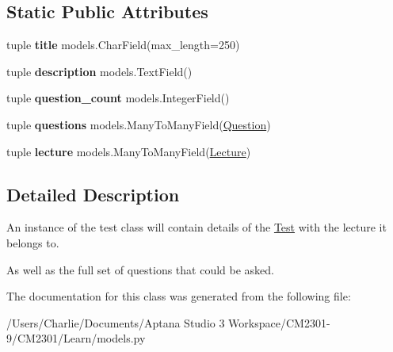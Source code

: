 \subsection*{Static Public Attributes}
\begin{DoxyCompactItemize}
\item 
\hypertarget{class_learn_1_1models_1_1_test_afa6b8269025be4e8a17d3d1259eec53b}{tuple {\bfseries title} models.\-Char\-Field(max\-\_\-length=250)}\label{class_learn_1_1models_1_1_test_afa6b8269025be4e8a17d3d1259eec53b}

\item 
\hypertarget{class_learn_1_1models_1_1_test_a1e99f210ccd11bf5b2dd55cab16d4384}{tuple {\bfseries description} models.\-Text\-Field()}\label{class_learn_1_1models_1_1_test_a1e99f210ccd11bf5b2dd55cab16d4384}

\item 
\hypertarget{class_learn_1_1models_1_1_test_a029d8b12971e04f78665d088b6a02961}{tuple {\bfseries question\-\_\-count} models.\-Integer\-Field()}\label{class_learn_1_1models_1_1_test_a029d8b12971e04f78665d088b6a02961}

\item 
\hypertarget{class_learn_1_1models_1_1_test_abac626d90f0bab225110dfd4c955e3d9}{tuple {\bfseries questions} models.\-Many\-To\-Many\-Field(\hyperlink{class_learn_1_1models_1_1_question}{Question})}\label{class_learn_1_1models_1_1_test_abac626d90f0bab225110dfd4c955e3d9}

\item 
\hypertarget{class_learn_1_1models_1_1_test_ab2cef470549f3fb48d3399faf4e8f446}{tuple {\bfseries lecture} models.\-Many\-To\-Many\-Field(\hyperlink{class_learn_1_1models_1_1_lecture}{Lecture})}\label{class_learn_1_1models_1_1_test_ab2cef470549f3fb48d3399faf4e8f446}

\end{DoxyCompactItemize}


\subsection{Detailed Description}
An instance of the test class will contain details of the \hyperlink{class_learn_1_1models_1_1_test}{Test} with the lecture it belongs to. 

As well as the full set of questions that could be asked. 

The documentation for this class was generated from the following file\-:\begin{DoxyCompactItemize}
\item 
/\-Users/\-Charlie/\-Documents/\-Aptana Studio 3 Workspace/\-C\-M2301-\/9/\-C\-M2301/\-Learn/models.\-py\end{DoxyCompactItemize}
